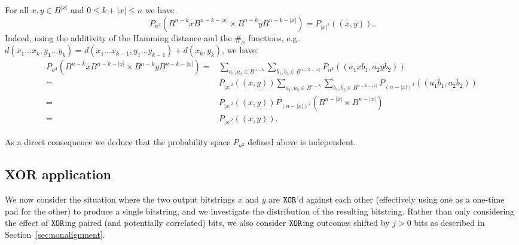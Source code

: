\documentclass{mscs}
\newtheorem{Fact}[Theorem]{Fact}
\newtheorem{Lemma}[Theorem]{Lemma}
\begin{document}
	For all $x,y \in B^{|x|}$ and $0\le k + |x| \le n$ we have
	$$P_{n^2}(B^{n-k}xB^{n-k-|x|} \times B^{n-k}yB^{n-k-|x|}) = P_{|x|^2}((x,y)).$$
	Indeed, using the additivity of the Hamming distance and the $\#_x$ functions, e.g. $d(x_1\dots x_k, y_1\dots y_k)=d(x_1\dots x_{k-1},y_1\dots y_{k-1})+d(x_k,y_k)$, we have:
	\begin{align*}
		P_{n^2}(B^{n-k}xB^{n-k-|x|} \times B^{n-k}yB^{n-k-|x|}) =& \sum_{a_1,a_2 \in B^{n-k}}\sum_{b_1,b_2\in B^{n-k-|x|}}P_{n^2}\left((a_1 x b_1,a_2 y b_2) \right)\\
		=& P_{|x|^2}((x,y))\sum_{a_1,a_2 \in B^{n-k}}\sum_{b_1,b_2\in B^{n-k-|x|}}P_{(n-|x|)^2}\left((a_1 b_1,a_2 b_2) \right)\\
		=& P_{|x|^2}((x,y)) P_{(n-|x|)^2}(B^{n-|x|}\times B^{n-|x|})\\
		=& P_{|x|^2}((x,y)).
	\end{align*}



	As a direct consequence we deduce that the probability space $P_{n^2}$  defined above
	is independent.

\subsection{XOR application}

We now consider the situation where the two output bitstrings $x$ and $y$ are ${\tt XOR}$'d against each other (effectively using one as a one-time pad for the other) to produce a single bitstring, and we investigate the distribution of the resulting bitstring. Rather than only considering the effect of ${\tt XOR}$ing paired (and potentially correlated) bits, we also consider ${\tt XOR}$ing outcomes shifted by $j>0$ bits as described in Section~\ref{sec:nonalignment}.
\end{document}

